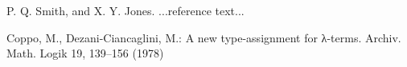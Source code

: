 \documentclass[preprint]{sigplanconf}
\begin{document}






\begin{thebibliography}{}
\softraggedright

P. Q. Smith, and X. Y. Jones. ...reference text...

Coppo, M., Dezani-Ciancaglini, M.: A new type-assignment for λ-terms. Archiv.
Math. Logik 19, 139–156 (1978)

\end{thebibliography}


\end{document}
